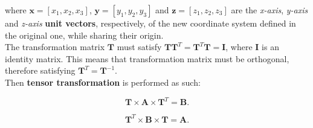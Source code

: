 \documentclass[10pt,b5paper,titlepage]{book}
\begin{document}
where $\mathbf{x} = [x_1, x_2, x_3]$, $\mathbf{y} = [y_1, y_2, y_3]$ and
$\mathbf{z} = [z_1, z_2, z_3]$ are the \textit{x-axis}, \textit{y-axis} and
\textit{z-axis} \textbf{unit vectors}, respectively, of the new coordinate
system defined in the original one, while sharing their origin.\\

The transformation matrix $\mathbf{T}$ must satisfy
$\mathbf{T}\mathbf{T}^{T} = \mathbf{T}^{T}\mathbf{T} = \mathbf{I}$, where $\mathbf{I}$
is an identity matrix. This means that transformation matrix must be orthogonal,
therefore satisfying $\mathbf{T}^{T} = \mathbf{T}^{-1}$.\\

Then \textbf{tensor transformation} is performed as such:

\begin{equation}
    \mathbf{T} \times \mathbf{A} \times \mathbf{T}^{T} = \mathbf{B}
.\end{equation}

\begin{equation}
    \mathbf{T}^{T} \times \mathbf{B} \times \mathbf{T} = \mathbf{A}
.\end{equation}
\end{document}
